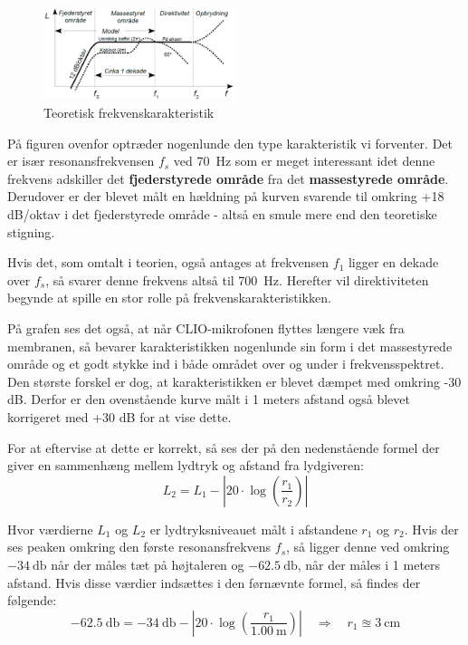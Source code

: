 \begin{figure} 
	\vspace{-20pt}
	\begin{center}
		\includegraphics[width=0.5\textwidth]{Billeder/FrekvenskarakteristikTeori}
	\end{center}
	\vspace{-15pt}
	\caption{Teoretisk frekvenskarakteristik}
	\vspace{-20pt}
\end{figure}
På figuren ovenfor optræder nogenlunde den type karakteristik vi forventer. Det er især resonansfrekvensen $f_s$ ved \SI{70}{\hertz} som er meget interessant idet denne frekvens adskiller det \textbf{fjederstyrede område} fra det \textbf{massestyrede område}. Derudover er der blevet målt en hældning på kurven svarende til omkring +18 dB/oktav i det fjederstyrede område - altså en smule mere end den teoretiske stigning.

Hvis det, som omtalt i teorien, også antages at frekvensen $f_1$ ligger en dekade over $f_s$, så svarer denne frekvens altså til \SI{700}{\hertz}. Herefter vil direktiviteten begynde at spille en stor rolle på frekvenskarakteristikken.

På grafen ses det også, at når CLIO-mikrofonen flyttes længere væk fra membranen, så bevarer karakteristikken nogenlunde sin form i det massestyrede område og et godt stykke ind i både området over og under i frekvensspektret. Den største forskel er dog, at karakteristikken er blevet dæmpet med omkring -30 dB. Derfor er den ovenstående kurve målt i 1 meters afstand også blevet korrigeret med +30 dB for at vise dette. 

For at eftervise at dette er korrekt, så ses der på den nedenstående formel der giver en sammenhæng mellem lydtryk og afstand fra lydgiveren:
\begin{equation}
L_2 = L_1 - \left| 20 \cdot \log \left( \frac{r_1}{r_2} \right) \right|
\end{equation}

Hvor værdierne $L_1$ og $L_2$ er lydtryksniveauet målt i afstandene $r_1$ og $r_2$. Hvis der ses peaken omkring den første resonansfrekvens $f_s$, så ligger denne ved omkring $-\SI{34}{\decibel}$ når der måles tæt på højtaleren og $-\SI{62.5}{\decibel}$, når der måles i 1 meters afstand. Hvis disse værdier indsættes i den førnævnte formel, så findes der følgende:
\begin{equation}
\SI{-62.5}{\decibel} = \SI{-34}{\decibel} - \left| 20 \cdot \log \left( \frac{r_1}{\SI{1.00}{\meter}} \right)\right| \quad \Rightarrow \quad r_1 \approxeq \SI{3}{\centi\meter}
\end{equation}

